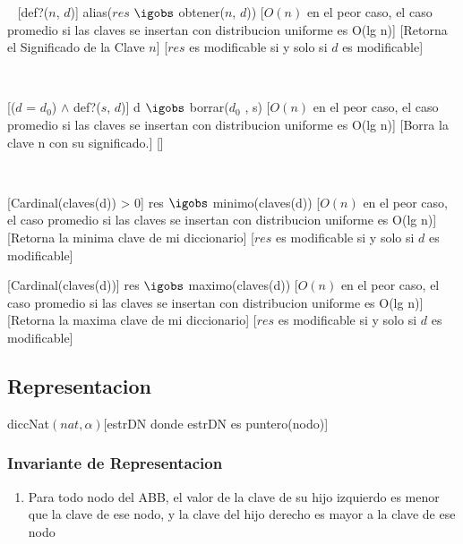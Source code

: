   ~
  [def?($n$, $d$)]
  {alias($res$ $\igobs$ obtener($n$, $d$))}
  [$O(n)$ en el peor caso, el caso promedio si las claves se insertan con distribucion uniforme es O(lg n)]
  [Retorna el Significado de la Clave $n$]
  [$res$ es modificable si y solo si $d$ es modificable]

  ~
  
  [($d$ = $d_0$) $\wedge$ def?($s$, $d$)]
  {d $\igobs$ borrar($d_0$ , s)}
  [$O(n)$ en el peor caso, el caso promedio si las claves se insertan con distribucion uniforme es O(lg n)]
  [Borra la clave n con su significado.]
  []
  
    
 ~
 
  [Cardinal(claves(d)) > 0]
  {res $\igobs$ minimo(claves(d))}
  [$O(n)$ en el peor caso, el caso promedio si las claves se insertan con distribucion uniforme es O(lg n)]
  [Retorna la minima clave de mi diccionario]
  [$res$ es modificable si y solo si $d$ es modificable]
  
  [Cardinal(claves(d))]
  {res $\igobs$ maximo(claves(d))}
  [$O(n)$ en el peor caso, el caso promedio si las claves se insertan con distribucion uniforme es O(lg n)]
  [Retorna la maxima clave de mi diccionario]
  [$res$ es modificable si y solo si $d$ es modificable]
 

\subsection{Representacion}

	\begin{Estructura}{diccNat$(nat, \alpha)$}[estrDN donde estrDN es puntero(nodo)]
		\begin{Tupla}[nodo]
		\end{Tupla}
	\end{Estructura}

\subsubsection{Invariante de Representacion}
\begin{enumerate}
\item Para todo nodo del ABB, el valor de la clave de su hijo izquierdo es menor que la clave de ese nodo, y la clave del hijo derecho es mayor a la clave de ese nodo
\end{enumerate}

